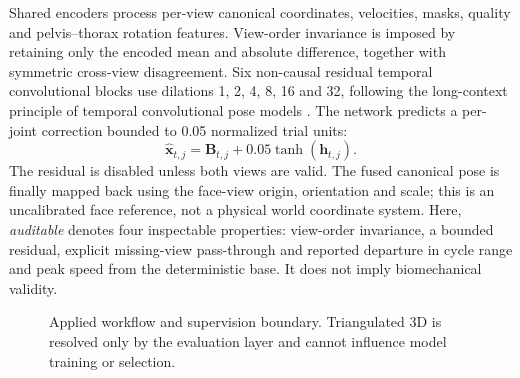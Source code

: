 \documentclass[lineno,pdflatex,sn-mathphys-num]{sn-jnl}
\begin{document}
Shared encoders process per-view canonical coordinates, velocities, masks,
quality and pelvis--thorax rotation features. View-order invariance is imposed
by retaining only the encoded mean and absolute difference, together with
symmetric cross-view disagreement. Six non-causal residual temporal
convolutional blocks use dilations 1, 2, 4, 8, 16 and 32, following the
long-context principle of temporal convolutional pose models
\cite{Bai2018TCN,Pavllo2019VideoPose3D}. The network predicts a per-joint
correction bounded to 0.05 normalized trial units:
\begin{equation}
 \widehat{\mathbf{x}}_{t,j}=\mathbf{B}_{t,j}
 +0.05\tanh(\mathbf{h}_{t,j}).
 \label{eq:residual}
\end{equation}
The residual is disabled unless both views are valid. The fused canonical pose
is finally mapped back using the face-view origin, orientation and scale; this
is an uncalibrated face reference, not a physical world coordinate system.
Here, \emph{auditable} denotes four inspectable properties: view-order
invariance, a bounded residual, explicit missing-view pass-through and reported
departure in cycle range and peak speed from the deterministic base. It does
not imply biomechanical validity.

\begin{figure}[t]
\centering
{}
\caption{Applied workflow and supervision boundary. Triangulated 3D is
resolved only by the evaluation layer and cannot influence model training or
selection.}
\label{fig:workflow}
\end{figure}
\end{document}
